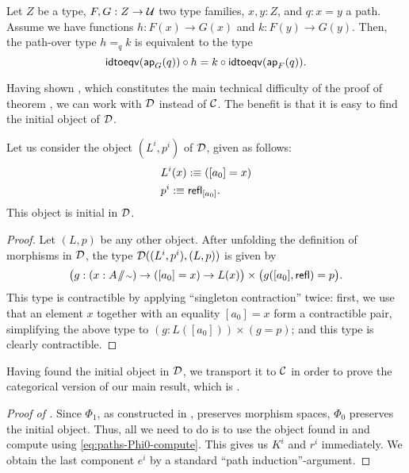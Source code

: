 \begin{lemma}\label{lem:paths-aux-lemma-function-eq}
Let $Z$ be a type, $F, G : Z \to \mathcal{U}$ two type families, $x, y : Z$,
and $q : x = y$ a path.
Assume we have functions $h : F(x) \to G(x)$ and $k : F(y) \to G(y)$.
Then, the path-over type $h =_q k$ is equivalent to the type
 \begin{equation*}
  \mathsf{idtoeqv}(\mathsf{ap}_G(q)) \circ h = k \circ \mathsf{idtoeqv}(\mathsf{ap}_F(q)).  
 \end{equation*}
\end{lemma}

Having shown , which constitutes the main
technical difficulty of the proof of theorem ,
we can work with $\mathcal D$ instead of $\mathcal C$.
The benefit is that it is easy to find the initial object of $\mathcal D$.

\begin{lemma} \label{lem:paths-D0-init}
 Let us consider the object $(L^i,p^i)$ of $\mathcal D$, given as follows:
 \begin{align*}
  & L^i(x) :\equiv ([a_0] = x) \\
  & p^i :\equiv \mathsf{refl}_{[a_0]}.
 \end{align*}
 This object is initial in $\mathcal D$.
\end{lemma}
\begin{proof}
 Let $(L,p)$ be any other object.
 After unfolding the definition of morphisms in $\mathcal D$, 
 the type $\mathcal D((L^i,p^i),(L,p))$ is given by
 \begin{equation*}
  \big(g : (x : A \! \sslash \! {\scriptstyle \sim}) \to ([a_0] = x) \to L(x)\big) \times
   \big(g([a_0], \mathsf{refl}) = p \big) \text{.}
 \end{equation*}
This type is contractible by applying ``singleton contraction'' twice:
first, we use that an element $x$ together with an equality $[a_0] = x$
form a contractible pair, simplifying the above type to $(g : L([a_0])) \times (g = p)$;
and this type is clearly contractible.
\end{proof}

Having found the initial object in $\mathcal D$, we transport it to $\mathcal C$ in order
to prove the categorical version of our main result, which is .
\begin{proof}[Proof of ]
Since $\Phi_1$, as constructed in , preserves
morphism spaces, $\Phi_0$ preserves the initial object.
Thus, all we need to do is to use the object found in 
and compute using \eqref{eq:paths-Phi0-compute}.
 This gives us $K^i$ and $r^i$ immediately.
 We obtain the last component $e^i$ by a standard ``path induction''-argument.
\end{proof}

